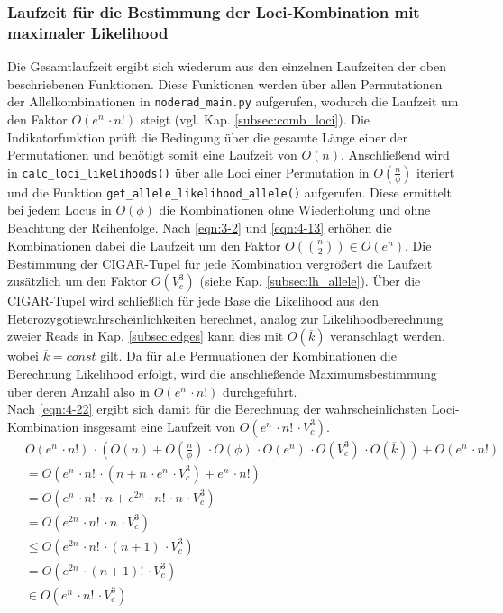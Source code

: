 \subsubsection{Laufzeit für die Bestimmung der Loci-Kombination mit maximaler Likelihood} \label{subsec:loc_compl}
Die Gesamtlaufzeit ergibt sich wiederum aus den einzelnen Laufzeiten der oben beschriebenen Funktionen. Diese Funktionen werden über allen Permutationen der Allelkombinationen in \lstinline|noderad_main.py| aufgerufen, wodurch die Laufzeit um den Faktor $ O(e^n \, \cdotp n!)$ steigt (vgl. Kap. \ref{subsec:comb_loci}). Die Indikatorfunktion prüft die Bedingung über die gesamte Länge einer der Permutationen und benötigt somit eine Laufzeit von $ O(n) $. Anschließend wird in \lstinline|calc_loci_likelihoods()| über alle Loci einer Permutation in $ O(\frac{n}{\phi}) $ iteriert und die Funktion \lstinline|get_allele_likelihood_allele()| aufgerufen. Diese ermittelt bei jedem Locus in $O(\phi) $ die Kombinationen ohne Wiederholung und ohne Beachtung der Reihenfolge. Nach \eqref{eqn:3-2} und \eqref{eqn:4-13} erhöhen die Kombinationen dabei die Laufzeit um den Faktor $ O(\binom{n}{2}) \in O(e^n) $. Die Bestimmung der CIGAR-Tupel für jede Kombination vergrößert die Laufzeit zusätzlich um den Faktor $O(V_{c}^3)$ (siehe Kap. \ref{subsec:lh_allele}). Über die CIGAR-Tupel wird schließlich für jede Base die Likelihood aus den Heterozygotiewahrscheinlichkeiten berechnet, analog zur Likelihoodberechnung zweier Reads in Kap. \ref{subsec:edges} kann dies mit $O(\overline{k}) $ veranschlagt werden, wobei $\overline{k}=const$ gilt. Da für alle Permuationen der Kombinationen die Berechnung Likelihood erfolgt, wird die anschließende Maximumsbestimmung über deren Anzahl also in $O(e^n\, \cdotp n!) $ durchgeführt.\\

Nach \eqref{eqn:4-22} ergibt sich damit für die Berechnung der wahrscheinlichsten Loci-Kombination insgesamt eine Laufzeit von $ O(e^n \, \cdotp n! \, \cdotp V_{c}^3)$.
\begin{equation} \label{eqn:4-22}
\tag{4-22}
\begin{aligned}
&\ {}O(e^n \, \cdotp n!) \, \cdotp \left( O(n) + O\left( \frac{n}{\phi} \right) \, \cdotp O(\phi) \, \cdotp O(e^n)  \, \cdotp O(V_{c}^3) \, \cdotp O(\overline{k})\right) + O(e^n\, \cdotp n!) \\
&\ =O(e^n \, \cdotp n! \, \cdotp(n + n \, \cdotp e^n \, \cdotp V_{c}^3)+ e^n\, \cdotp n!)  \\
&\ =O(e^n \, \cdotp n! \, \cdotp n + e^{2n} \, \cdotp n! \, \cdotp n \, \cdotp V_{c}^3)\\
&\ =O(e^{2n} \, \cdotp n! \, \cdotp n \, \cdotp V_{c}^3)\\
&\ \leq O(e^{2n} \, \cdotp n! \, \cdotp (n + 1) \, \cdotp V_{c}^3)\\
&\ = O(e^{2n} \, \cdotp (n + 1)! \, \cdotp V_{c}^3)\\
&\ \in O(e^n \, \cdotp n! \, \cdotp V_{c}^3)\\
\end{aligned}
\end{equation}

